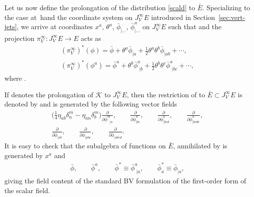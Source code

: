 \documentclass[pdftex]{sigma}
\numberwithin{equation}{section}
\theoremstyle{definition}
\renewcommand{\tilde}{\widetilde}
\renewcommand{\d}{\partial}
\newcommand{\ffrac}[2]{\raisebox{.5pt}%
 {\footnotesize$\displaystyle\frac{#1}{#2}$}\kern1pt}
\newcommand{\dl}[1]{\mathchoice{\ffrac{\d}{\d #1}}{\frac{\d}{\d #1}}{\ffrac{\d}{\d #1}}{\ffrac{\d}{\d #1}}}
\def\cK{\mathcal{K}}
\newcommand{\vprol}{\tilde}
\begin{document}
Let us now define the prolongation of the distribution \eqref{scald} to $\bar{E}$.
Specializing to the case at~hand the coordinate system on $J^\infty_VE$ introduced in Section~\ref{sec:vert-jets}, we arrive at coordinates
$x^a$, $\theta^a$, $\bar \phi_{|\dots}$, $\bar \phi^a_{|\dots}$ on $J^\infty_VE$
such that \smash{$D^{(\theta)}_a=\dl{\theta^a}$} and the projection $\pi^\infty_V\colon J^\infty_VE \to E$ acts as
\begin{gather*}
 (\pi^\infty_V)^*(\phi)=\bar\phi+\theta^a\bar\phi_{|a}+\frac{1}{2}\theta^a\theta^b\bar\phi_{|ab}+\cdots,\\
 (\pi^\infty_V)^*(\phi^a)=\bar\phi^a+\theta^b\bar\phi^a_{\,\,|b}+\frac{1}{2}\theta^b\theta^c\bar\phi^a_{\,\,|bc}+\cdots,
 \end{gather*}
where .

If \smash{\smash{$\vprol{\cK}$}} denotes the prolongation of $\cK$ to $J^\infty_VE$, then the restriction of \smash{$\vprol{\cK}$} to
$\bar E\subset J^\infty_VE$ is denoted by \smash{$\vprol{\cK}_0$} and is generated by the following vector fields
\begin{gather*}
 \biggl(\frac{1}{4}\eta_{ab}\delta^m_n-\eta_{an}\delta^m_b\biggr)\frac{\partial}{\partial \bar{\phi}^m_{\,\,\,\,|n}},
 \qquad \frac{\partial}{\partial \bar\phi^a_{|bc}},
 \qquad \frac{\partial}{\partial \bar\phi^a_{|bcd}},
 \qquad \frac{\partial}{\partial \bar\phi^a_{|bcde}},\\
 \frac{\partial}{\partial\bar{\phi}_{|ab}},\qquad
 \frac{\partial}{\partial\bar{\phi}_{|abc}}, \qquad
 \frac{\partial}{\partial\bar{\phi}_{|abcd}}.
 \end{gather*}
It is easy to check that the subalgebra of functions on $\bar E$, annihilated by \smash{$\vprol{\cK}_0$} is generated by $x^a$ and
\begin{gather}
 \bar\phi,\qquad \bar\phi^a,\qquad
 \bar\phi^*\equiv\bar\phi^a_{\,\,|a},\qquad \bar\phi^*_a\equiv\bar\phi_{|a},\label{scaldalg}
 \end{gather}
giving the field content of the standard BV formulation of the first-order form of the scalar field.
\end{document}
